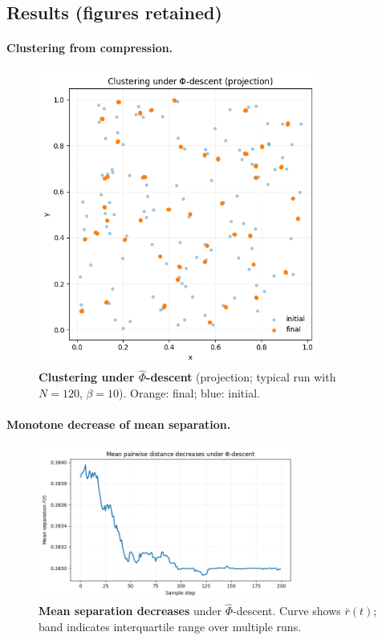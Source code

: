\documentclass[aps,preprint,onecolumn,longbibliography,nofootinbib]{revtex4-2}
\numberwithin{equation}{section}        %
\begin{document}
\subsection{Results (figures retained)}
\paragraph*{Clustering from compression.}
\begin{figure}[H]
\centering
\includegraphics[width=0.82\textwidth]{figures/clustering.png}
\caption{\textbf{Clustering under $\widehat\Phi$-descent} (projection; typical run with $N{=}120$, $\beta{=}10$). Orange: final; blue: initial.}
\label{fig:clustering}
\end{figure}

\paragraph*{Monotone decrease of mean separation.}
\begin{figure}[H]
\centering
\includegraphics[width=0.75\textwidth]{figures/mean_distance.png}
\caption{\textbf{Mean separation decreases} under $\widehat\Phi$-descent. Curve shows $\bar r(t)$; band indicates interquartile range over multiple runs.}
\label{fig:mean}
\end{figure}
\end{document}
